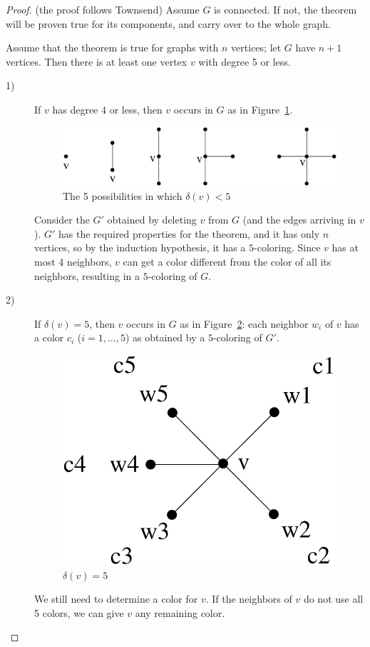 \begin{proof} (the proof follows Townsend)
Assume $G$ is connected.
If not, the theorem will be proven true for its components, and carry
over to the whole graph.
{Assume that the theorem is true for
graphs with $n$ vertices; let $G$ have $n+1$ vertices. Then there is
at least one vertex $v$ with degree 5 or less.
\begin{description}
\item[1)]
If $v$ has degree 4 or less, then $v$ occurs in $G$ as in
Figure~\ref{5kleuring1}.

\begin{figure}[ht]
	\centering
	\includegraphics[width=0.6\linewidth,keepaspectratio]{5kleuring1}
	\caption{The 5 possibilities in which $\delta(v) < 5$ \label{5kleuring1}}
\end{figure}

Consider the $G'$ obtained by deleting $v$ from $G$ (and the edges
arriving in $v$). $G'$ has the required properties for the theorem,
and it has only $n$ vertices, so by the induction hypothesis, it has a
$5$-coloring. Since $v$ has at most 4 neighbors, $v$ can get a color
different from the color of all its neighbors, resulting in a
$5$-coloring of $G$.

\item[2)]
If $\delta(v) = 5$, then $v$ occurs in $G$ as in
Figure~\ref{5kleuring2}: each neighbor $w_{i}$ of $v$ has a color
$c_{i}$ ($i = 1,\ldots,5$) as obtained by a $5$-coloring of $G'$.

\begin{figure}[ht]
	\centering
	\includegraphics[width=0.25\linewidth,keepaspectratio]{5kleuring2}
	\caption{$\delta(v) = 5$ \label{5kleuring2}}
\end{figure}

We still need to determine a color for $v$. If the neighbors of $v$ do
not use all 5 colors, we can give $v$ any remaining color.


\end{description}}
\end{proof}
